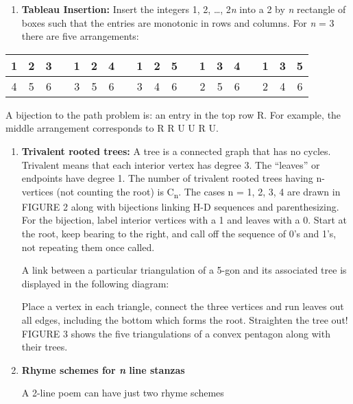 \documentclass[10pt,letter]{article}
\begin{document}
\begin{enumerate}
\def\labelenumi{\Roman{enumi}.}

\item
  \textbf{Tableau Insertion:} Insert the integers 1, 2, \ldots{},
  2\emph{n} into a 2 by \emph{n} rectangle of boxes such that the
  entries are monotonic in rows and columns. For \emph{n} = 3 there are
  five arrangements:

\end{enumerate}

\begin{longtable}[]{@{}ccccccccccccccccccc@{}}
\toprule
1 & 2 & 3 & & 1 & 2 & 4 & & 1 & 2 & 5 & & 1 & 3 & 4 & & 1 & 3 &
5\tabularnewline
\midrule
\endhead
4 & 5 & 6 & & 3 & 5 & 6 & & 3 & 4 & 6 & & 2 & 5 & 6 & & 2 & 4 &
6\tabularnewline
\bottomrule

\end{longtable}

A bijection to the path problem is: an entry in the top row  R. For
example, the middle arrangement corresponds to R R U U R U.

\begin{enumerate}
\def\labelenumi{\Roman{enumi}.}

\item
  \textbf{Trivalent rooted trees:} A tree is a connected graph that has
  no cycles. Trivalent means that each interior vertex has degree 3. The
  ``leaves'' or endpoints have degree 1. The number of trivalent rooted
  trees having n-vertices (not counting the root) is C\textsubscript{n}.
  The cases n = 1, 2, 3, 4 are drawn in FIGURE 2 along with bijections
  linking H-D sequences and parenthesizing. For the bijection, label
  interior vertices with a 1 and leaves with a 0. Start at the root,
  keep bearing to the right, and call off the sequence of 0's and 1's,
  not repeating them once called.

A link between a particular triangulation of a 5-gon and its
  associated tree is displayed in the following diagram:

Place a vertex in each triangle, connect the three vertices and run
  leaves out all edges, including the bottom which forms the root.
  Straighten the tree out! FIGURE 3 shows the five triangulations of a
  convex pentagon along with their trees.
\item
  \textbf{Rhyme schemes for \emph{n} line stanzas}

A 2-line poem can have just two rhyme schemes

\end{enumerate}
\end{document}
